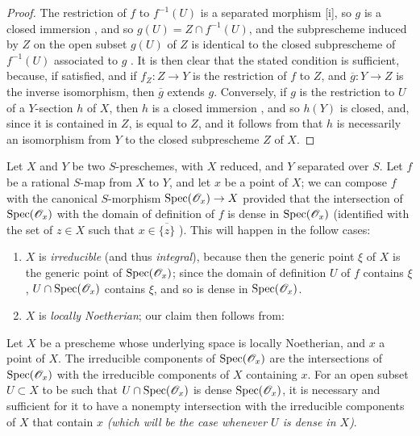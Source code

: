 \begin{proof}
\label{proof-1.7.2.7}
The restriction of $f$ to $f^{-1}(U)$ is a separated morphism [i], so $g$ is a closed immersion , and so $g(U)=Z\cap f^{-1}(U)$, and the subprescheme induced by $Z$ on the open subset $g(U)$ of $Z$ is identical to the closed subprescheme of $f^{-1}(U)$ associated to $g$ .
It is then clear that the stated condition is sufficient, because, if satisfied, and if $f_Z:Z\to Y$ is the restriction of $f$ to $Z$, and $\overline{g}:Y\to Z$ is the inverse isomorphism, then $\overline{g}$ extends $g$.
Conversely, if $g$ is the restriction to $U$ of a $Y$-section $h$ of $X$, then $h$ is a closed immersion , and so $h(Y)$ is closed, and, since it is contained in $Z$, is equal to $Z$, and it follows from  that $h$ is necessarily an isomorphism from $Y$ to the closed subprescheme $Z$ of $X$.
\end{proof}

\begin{env}[7.2.8]
\label{1.7.2.8}
Let $X$ and $Y$ be two $S$-preschemes, with $X$ reduced, and $Y$ separated over $S$.
Let $f$ be a rational $S$-map from $X$ to $Y$, and let $x$ be a point of $X$; we can compose $f$ with the canonical $S$-morphism $\Spec(\OO_x)\to X$  provided that the intersection of ${\mathop{\mathrm{Spec}}\nolimits}(\mathscr{O}_x)$ with the domain of definition of $f$ is dense in ${\mathop{\mathrm{Spec}}\nolimits}(\mathscr{O}_x)$ (identified with the set of $z\in X$ such that $x\in\overline{\{z\}}$ ).
This will happen in the follow cases:
\begin{enumerate}
    \item $X$ is \emph{irreducible} (and thus \emph{integral}), because then the generic point $\xi$ of $X$ is the generic point of ${\mathop{\mathrm{Spec}}\nolimits}(\mathscr{O}_x)$; since the domain of definition $U$ of $f$ contains $\xi$, $U\cap{\mathop{\mathrm{Spec}}\nolimits}(\mathscr{O}_x)$ contains $\xi$, and so is dense in ${\mathop{\mathrm{Spec}}\nolimits}(\mathscr{O}_x)$.
    \item $X$ is \emph{locally Noetherian}; our claim then follows from:
\end{enumerate}
\end{env}

\begin{lem}[7.2.8.1]
\label{1.7.2.8.1}
Let $X$ be a prescheme whose underlying space is locally Noetherian, and $x$ a point of $X$.
The irreducible components of ${\mathop{\mathrm{Spec}}\nolimits}(\mathscr{O}_x)$ are the intersections of ${\mathop{\mathrm{Spec}}\nolimits}(\mathscr{O}_x)$ with the irreducible components of $X$ containing $x$.
For an open subset $U\subset X$ to be such that $U\cap{\mathop{\mathrm{Spec}}\nolimits}(\mathscr{O}_x)$ is dense ${\mathop{\mathrm{Spec}}\nolimits}(\mathscr{O}_x)$, it is necessary and sufficient for it to have a nonempty intersection with the irreducible components of $X$ that contain $x$ \emph{(which will be the case whenever $U$ is \emph{dense} in $X$)}.
\end{lem}

